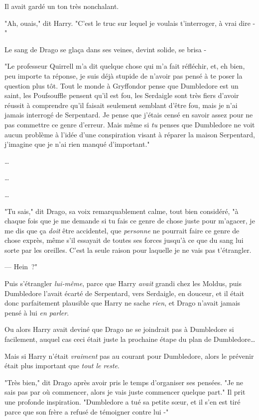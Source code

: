 Il avait gardé un ton très nonchalant.

"Ah, ouais," dit Harry. "C'est le truc sur lequel je voulais t'interroger, à vrai dire -"

Le sang de Drago se glaça dans ses veines, devint solide, se brisa -

"Le professeur Quirrell m'a dit quelque chose qui m'a fait réfléchir, et, eh bien, peu importe ta réponse, je suis déjà stupide de n'avoir pas pensé à te poser la question plus tôt. Tout le monde à Gryffondor pense que Dumbledore est un saint, les Poufsouffle pensent qu'il est fou, les Serdaigle sont très fiers d'avoir réussit à comprendre qu'il faisait seulement semblant d'être fou, mais je n'ai jamais interrogé de Serpentard. Je pense que j'étais censé en savoir assez pour ne pas commettre ce genre d'erreur. Mais même si \emph{tu} penses que Dumbledore ne voit aucun problème à l'idée d'une conspiration visant à réparer la maison Serpentard, j'imagine que je n'ai rien manqué d'important."

…

…

…

"Tu sais," dit Drago, sa voix remarquablement calme, tout bien considéré, "à chaque fois que je me demande si tu fais ce genre de chose juste pour m'agacer, je me dis que ça \emph{doit} être accidentel, que \emph{personne} ne pourrait faire ce genre de chose exprès, même s'il essayait de toutes ses forces jusqu'à ce que du sang lui sorte par les oreilles. C'est la seule raison pour laquelle je ne vais pas t'étrangler.

--- Hein~?"

Puis s'étrangler \emph{lui-même}, parce que Harry \emph{avait} grandi chez les Moldus, puis Dumbledore l'avait écarté de Serpentard, vers Serdaigle, en douceur, et il était donc parfaitement plausible que Harry ne sache \emph{rien}, et Drago n'avait jamais pensé à lui \emph{en parler}.

Ou alors Harry avait deviné que Drago ne se joindrait pas à Dumbledore si facilement, auquel cas ceci était juste la prochaine étape du plan de Dumbledore…

Mais si Harry n'était \emph{vraiment} pas au courant pour Dumbledore, alors le prévenir était plus important que \emph{tout le reste}.

"Très bien," dit Drago après avoir pris le temps d'organiser ses pensées. "Je ne sais pas par où commencer, alors je vais juste commencer quelque part." Il prit une profonde inspiration. "Dumbledore a tué sa petite sœur, et il s'en est tiré parce que son frère a refusé de témoigner contre lui -"

